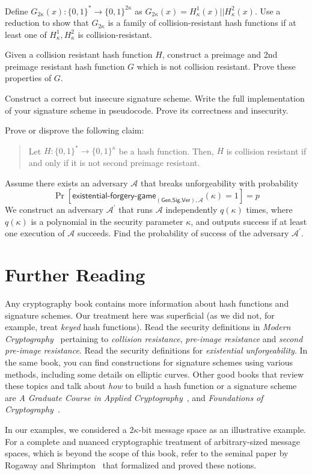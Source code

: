 \begin{problems}
        Define $G_{2\kappa}(x) : \{0, 1\}^* \longrightarrow \{0,1\}^{2\kappa}$ as $G_{2\kappa}(x) = H_\kappa^1(x)||H_\kappa^2(x)$. 
        Use a reduction to show that $G_{2\kappa}$ is a family of collision-resistant hash functions if at least one of $H_\kappa^1, H_\kappa^2$ 
        is collision-resistant.
  \item Given a collision resistant hash function $H$, construct a preimage and
        2nd preimage resistant hash function $G$ which is not collision
        resistant. Prove these properties of $G$.
  \item Construct a correct but insecure signature scheme. Write the full
        implementation of your signature scheme in pseudocode. Prove its
        correctness and insecurity.
  \item Prove or disprove the following claim:
        \begin{quote}
          Let $H: \{0, 1\}^* \longrightarrow \{0, 1\}^\kappa$ be a hash
          function. Then, $H$ is collision resistant if and only if it is not
          second preimage resistant.
        \end{quote}
  \item Assume there exists an adversary $\mathcal{A}$ that breaks unforgeability with probability
        \[
          \Pr[\textsf{existential-forgery-game}_{(\textsf{Gen,Sig,Ver}),\mathcal{A}}(\kappa) = 1] = p
        \]
        We construct an adversary $\mathcal{A}^\prime$ that runs $\mathcal{A}$ independently \(q(\kappa)\) times, where
        \(q(\kappa)\) is a polynomial in the security parameter \(\kappa\), and outputs success
        if at least one execution of $\mathcal{A}$ succeeds.
        Find the probability of success of the adversary $\mathcal{A}^\prime$.
\end{problems}

\section*{Further Reading}

Any cryptography book contains more information about hash functions and signature schemes.
Our treatment here was superficial (as we did not, for example, treat \emph{keyed} hash functions).
Read the security definitions in \emph{Modern Cryptography}~\cite{katz} pertaining to \emph{collision resistance},
\emph{pre-image resistance} and \emph{second pre-image resistance}. Read the security definitions
for \emph{existential unforgeability}. In the same book, you can find constructions for signature
schemes using various methods, including some details on elliptic curves.
Other good books that review these topics and talk about \emph{how} to build a hash function or
a signature scheme are
\emph{A Graduate Course in Applied Cryptography}~\cite{cryptobook},
and
\emph{Foundations of Cryptography}~\cite{foundations1,foundations2}.

In our examples, we considered a $2\kappa$-bit message space as an illustrative example.
For a complete and nuanced cryptographic treatment of arbitrary-sized message spaces,
which is beyond the scope of this book, refer to the seminal paper by
Rogaway and Shrimpton~\cite{rogaway2004cryptographic} that formalized and proved these notions.
